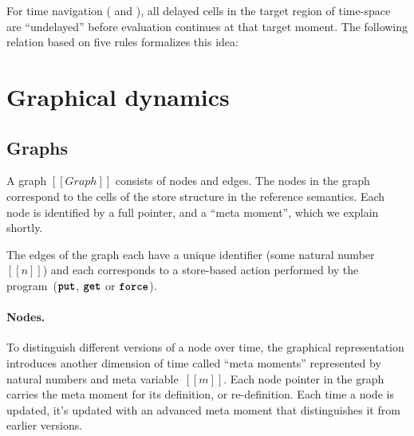 \documentclass[11pt]{article}
\renewcommand{\ottkw}[1]{\textbf{\texttt{#1}}}
\begin{document}
For time navigation ( and ),
all delayed cells in the target region of time-space are ``undelayed''
before evaluation continues at that target moment.
%
The following relation based on five rules formalizes this idea:

\begin{mathpar}
\end{mathpar}


\section{Graphical dynamics}
\label{sec:graphical-dynamics}

\subsection{Graphs}
\label{sec:graphs}

A graph $[[Graph]]$ consists of nodes and edges.
%
The nodes in the graph correspond to the cells of the store structure in the reference semantics.
%
Each node is identified by a full pointer, and a ``meta moment'', which we explain shortly.

The edges of the graph each have a unique identifier (some natural number~$[[n]]$) and each corresponds to a store-based action performed by the program~($\ottkw{put}$, $\ottkw{get}$ or $\ottkw{force}$).

\ottgrammartabular{
  \ottGraph
}


\ottgrammartabular{
  \ottppp
}

\paragraph{Nodes.}
To distinguish different versions of a node over time,
the graphical representation introduces another dimension of time called ``meta moments''
represented by natural numbers and meta variable~$[[m]]$.
%
Each node pointer in the graph carries the meta moment for its definition, or re-definition.
%
Each time a node is updated, it's updated with an advanced meta moment that distinguishes it from earlier versions.
\end{document}
